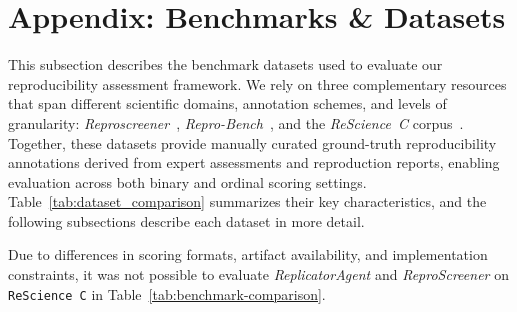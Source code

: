 \documentclass{article}
\begin{document}
\section{Appendix: Benchmarks \& Datasets} \label{appendix:benchmarks}

This subsection describes the benchmark datasets used to evaluate our reproducibility assessment framework. 
We rely on three complementary resources that span different scientific domains, annotation schemes, and levels of granularity: \textit{Reproscreener}~\citep{bhaskar2024reproscreener}, \textit{Repro-Bench}~\citep{hu2025repro}, and the \textit{ReScience~C} corpus~\citep{rougier2018rescience}. 
Together, these datasets provide manually curated ground-truth reproducibility annotations derived from expert assessments and reproduction reports, enabling evaluation across both binary and ordinal scoring settings. 
Table~\ref{tab:dataset_comparison} summarizes their key characteristics, and the following subsections describe each dataset in more detail.

Due to differences in scoring formats, artifact availability, and implementation constraints, it was not possible to evaluate \textit{ReplicatorAgent} and \textit{ReproScreener} on \texttt{ReScience C} in Table~\ref{tab:benchmark-comparison}.
\end{document}
